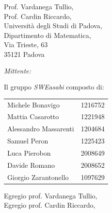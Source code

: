 \documentclass{article}
\begin{document}
\begin{center}
\begin{minipage}[t]{0.49\linewidth}
\begin{flushleft}
\begin{minipage}[t]{0.8\linewidth}
\begin{flushleft}
            Prof. Vardanega Tullio,\\
            Prof. Cardin Riccardo,\\
            Università degli Studi di Padova,\\
            Dipartimento di Matematica,\\
            Via Trieste, 63\\
            35121 Padova\\        
        \end{flushleft}
        \end{minipage}
        \end{flushleft}
    \end{minipage}
    \begin{minipage}[t]{0.49\linewidth}
        \begin{flushright}

        \begin{minipage}[t]{1\linewidth}
            
        \begin{flushright}
        \normalsize
        \textit{Mittente:}
        \vspace{0.5cm}

        Il gruppo \textit{SWEasabi} composto di:
            \begin{tabularx}{0.87\linewidth}{l | X}
                Michele Bonavigo & 1216752 \\
                Mattia Casarotto & 1221948 \\
                Alessandro Massarenti & 1204684 \\
                Samuel Peron & 1225423 \\
                Luca Pierobon & 2008649 \\
                Davide Romano & 2008652 \\
                Giorgio Zarantonello & 1097629 
            \end{tabularx}
        \end{flushright}
        \end{minipage}
        \end{flushright}
    \end{minipage}
    
    \normalsize
\end{center}

\vspace{2cm}

Egregio prof. Vardanega Tullio,\\
Egregio prof. Cardin Riccardo,
\end{document}

